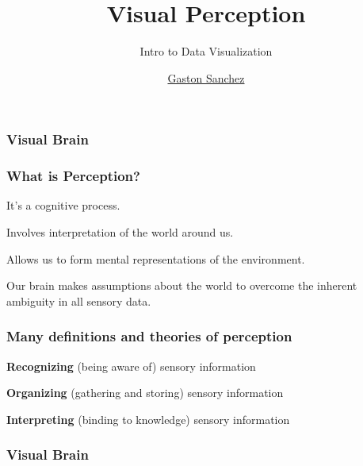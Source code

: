 \documentclass[12pt]{beamer}\usepackage[]{graphicx}\usepackage[]{color}
\title{Visual Perception}
\subtitle{Intro to Data Visualization}
\author{\href{http://www.gastonsanchez.com}{Gaston Sanchez}}
\institute{\href{https://creativecommons.org/licenses/by-sa/4.0/}{\tt \scriptsize \color{foreground} CC BY-SA 4.0}}
\date{}
\begin{document}
{
  \frame{\titlepage} 
}


\begin{frame}
\begin{center}
\Huge{}
\end{center}
\end{frame}


\begin{frame}
\frametitle{Visual Brain}
\begin{center}
\end{center}
\end{frame}

\begin{frame}
\frametitle{What is Perception?}

\bbi
  \item It's a cognitive process.
  \item Involves interpretation of the world around us.
  \item Allows us to form mental representations of the environment.
  \item Our brain makes assumptions about the world to overcome the inherent ambiguity
in all sensory data.
\ei

\end{frame}


\begin{frame}
\frametitle{Many definitions and theories of perception}

\bbi
  \item \textbf{Recognizing} (being aware of) sensory information
  \item \textbf{Organizing} (gathering and storing) sensory information
  \item \textbf{Interpreting} (binding to knowledge) sensory information
\ei
\eb

\end{frame}


\begin{frame}
\frametitle{Visual Brain}
\begin{center}
\end{center}
\end{frame}
\end{document}
